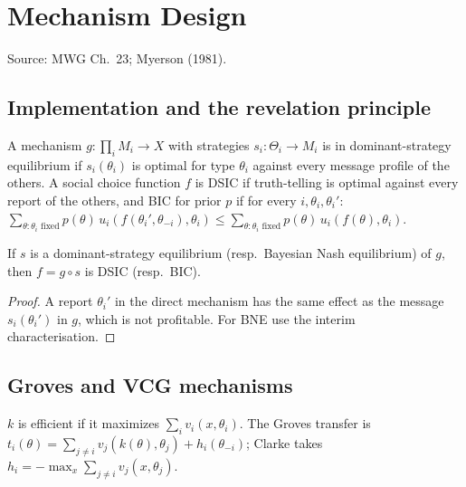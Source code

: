 \chapter{Mechanism Design}
\label{chap:mechanism}

Source: MWG Ch.~23; Myerson (1981).

\section{Implementation and the revelation principle}
\label{sec:revelation}

\begin{definition}
\label{def:dsic}
\leanok
{}
A mechanism $g : \prod_i M_i \to X$ with strategies $s_i : \Theta_i \to M_i$ is in dominant-strategy equilibrium if
$s_i(\theta_i)$ is optimal for type $\theta_i$ against every message profile of the others. A social choice function
$f$ is DSIC if truth-telling is optimal against every report of the others, and BIC for prior $p$ if for every
$i, \theta_i, \theta_i'$: $\sum_{\theta : \theta_i \text{ fixed}} p(\theta)\, u_i(f(\theta_i', \theta_{-i}), \theta_i) \le
\sum_{\theta : \theta_i \text{ fixed}} p(\theta)\, u_i(f(\theta), \theta_i)$.
\end{definition}

\begin{theorem}
\label{thm:revelation}
\leanok
{}
If $s$ is a dominant-strategy equilibrium (resp.\ Bayesian Nash equilibrium) of $g$, then
$f = g \circ s$ is DSIC (resp.\ BIC).
\end{theorem}
\begin{proof}
\leanok
A report $\theta_i'$ in the direct mechanism has the same effect as the message $s_i(\theta_i')$ in $g$, which is not
profitable. For BNE use the interim characterisation.
\end{proof}

\section{Groves and VCG mechanisms}
\label{sec:vcg}

\begin{definition}
\label{def:groves}
\leanok
$k$ is efficient if it maximizes $\sum_i v_i(x,\theta_i)$. The Groves transfer is
$t_i(\theta) = \sum_{j\ne i} v_j(k(\theta),\theta_j) + h_i(\theta_{-i})$; Clarke takes
$h_i = -\max_x \sum_{j\ne i} v_j(x,\theta_j)$.
\end{definition}

